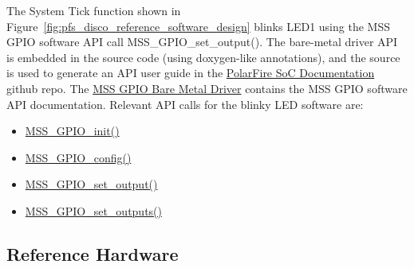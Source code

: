 The System Tick function shown in Figure~\ref{fig:pfs_disco_reference_software_design}
blinks LED1 using the MSS GPIO software API call MSS\_GPIO\_set\_output().
%
The bare-metal driver API is embedded in the source code (using doxygen-like
annotations), and the source is used to generate an API user guide in the
\href{https://github.com/polarfire-soc/polarfire-soc-documentation}
{PolarFire SoC Documentation} github repo.
%
The
\href{https://github.com/polarfire-soc/polarfire-soc-documentation/blob/master/bare-metal-embedded-software/bare-metal-driver-user-guides/polarfire-soc-mss-driver-user-guides/mss-gpio/mss-gpio-driver-user-guide.md}
{MSS GPIO Bare Metal Driver} contains the MSS GPIO software API
documentation. Relevant API calls for the blinky LED software are:
%
\begin{itemize}
\item
\href{https://github.com/polarfire-soc/polarfire-soc-documentation/blob/master/bare-metal-embedded-software/bare-metal-driver-user-guides/polarfire-soc-mss-driver-user-guides/mss-gpio/mss-gpio-driver-user-guide.md#mss_gpio_init}
{MSS\_GPIO\_init()}
\item
\href{https://github.com/polarfire-soc/polarfire-soc-documentation/blob/master/bare-metal-embedded-software/bare-metal-driver-user-guides/polarfire-soc-mss-driver-user-guides/mss-gpio/mss-gpio-driver-user-guide.md#mss_gpio_config}
{MSS\_GPIO\_config()}
\item
\href{https://github.com/polarfire-soc/polarfire-soc-documentation/blob/master/bare-metal-embedded-software/bare-metal-driver-user-guides/polarfire-soc-mss-driver-user-guides/mss-gpio/mss-gpio-driver-user-guide.md#mss_gpio_set_output}
{MSS\_GPIO\_set\_output()}
\item
\href{https://github.com/polarfire-soc/polarfire-soc-documentation/blob/master/bare-metal-embedded-software/bare-metal-driver-user-guides/polarfire-soc-mss-driver-user-guides/mss-gpio/mss-gpio-driver-user-guide.md#mss_gpio_set_outputs}
{MSS\_GPIO\_set\_outputs()}
\end{itemize}

\clearpage
\subsection{Reference Hardware}

